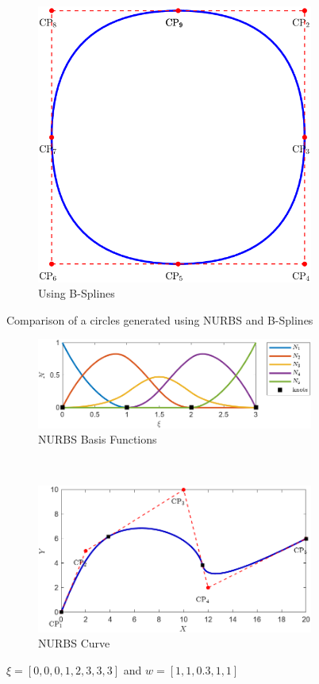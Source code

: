 \documentclass[12pt, a4paper]{report}
\begin{document}
\begin{figure}[H]
\begin{subfigure}{0.4\textwidth}
  \includegraphics[width=\linewidth]{Images/cir2.png}
  \caption{Using B-Splines}
\end{subfigure}
\caption{Comparison of a circles generated using NURBS and B-Splines }
\label{fig:bspl_comp}
\end{figure}

\begin{figure}[H]
\centering
\begin{subfigure}{0.8\textwidth}
  \centering
  \includegraphics[width=0.8\linewidth]{Images/NURBS_3.jpg}
  \caption{NURBS Basis Functions }
\end{subfigure}\\[1ex] %
\begin{subfigure}{0.8\textwidth}
  \centering
  \includegraphics[width=0.8\linewidth]{Images/nCurve_3.png}
  \caption{NURBS Curve}
\end{subfigure}
\caption{ $\xi=[0, 0, 0, 1, 2, 3, 3, 3]$ and $w=[1,1,0.3,1,1]$ }
\label{fig:curve3}
\end{figure}
\end{document}
